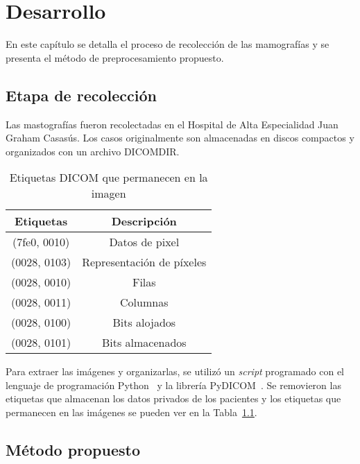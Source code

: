 \chapter{Desarrollo}
\label{desarrollo}

En este capítulo se detalla el proceso de recolección de las mamografías y se
presenta el método de preprocesamiento propuesto.

\section{Etapa de recolección}

Las mastografías fueron recolectadas en el Hospital de Alta Especialidad Juan
Graham Casasús. Los casos originalmente son almacenadas en discos compactos y
organizados con un archivo DICOMDIR. 

\begin{table}[h]
  \caption[Etiquetas DICOM]{Etiquetas DICOM que permanecen en la imagen} 
  \label{table:dicomtags}
\begin{center}
{\scriptsize
    \begin{tabular}{c|c}
    \hline

    {\bf Etiquetas} & 
    {\bf Descripción} \\
    \hline
        (7fe0, 0010) & Datos de pixel\\
        (0028, 0103) & Representación de píxeles \\
        (0028, 0010) & Filas \\
        (0028, 0011) & Columnas \\
        (0028, 0100) & Bits alojados \\
        (0028, 0101) & Bits almacenados \\
    \hline
    \end{tabular}
}
\end{center}
\end{table}

Para extraer las imágenes y organizarlas, se utilizó un \textit{script}
programado con el lenguaje de programación Python~\cite{python} y la librería
PyDICOM~\cite{pydicom}. Se removieron las etiquetas que almacenan los datos
privados de los pacientes y los etiquetas que permanecen en las imágenes se
pueden ver en la Tabla~\ref{table:dicomtags}.

\section{Método propuesto}

